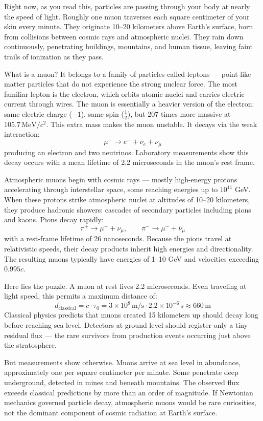 Right now, as you read this, particles are passing through your body at nearly the speed of light. Roughly one muon traverses each square centimeter of your skin every minute. They originate 10–20 kilometers above Earth's surface, born from collisions between cosmic rays and atmospheric nuclei. They rain down continuously, penetrating buildings, mountains, and human tissue, leaving faint trails of ionization as they pass.

What is a muon? It belongs to a family of particles called leptons — point-like matter particles that do not experience the strong nuclear force. The most familiar lepton is the electron, which orbits atomic nuclei and carries electric current through wires. The muon is essentially a heavier version of the electron: same electric charge ($-1$), same spin ($\tfrac{1}{2}$), but 207 times more massive at $105.7\,\text{MeV}/c^2$. This extra mass makes the muon unstable. It decays via the weak interaction:
\[
\mu^- \rightarrow e^- + \bar{\nu}_e + \nu_\mu
\]
producing an electron and two neutrinos. Laboratory measurements show this decay occurs with a mean lifetime of 2.2 microseconds in the muon's rest frame.

Atmospheric muons begin with cosmic rays — mostly high-energy protons accelerating through interstellar space, some reaching energies up to $10^{11}$ GeV. When these protons strike atmospheric nuclei at altitudes of 10–20 kilometers, they produce hadronic showers: cascades of secondary particles including pions and kaons. Pions decay rapidly:
\[
\pi^+ \rightarrow \mu^+ + \nu_\mu, \qquad \pi^- \rightarrow \mu^- + \bar{\nu}_\mu
\]
with a rest-frame lifetime of 26 nanoseconds. Because the pions travel at relativistic speeds, their decay products inherit high energies and directionality. The resulting muons typically have energies of 1–10 GeV and velocities exceeding $0.995c$.

Here lies the puzzle. A muon at rest lives 2.2 microseconds. Even traveling at light speed, this permits a maximum distance of:
\[
d_{\text{classical}} = c \cdot \tau_0 = 3 \times 10^8\,\text{m/s} \cdot 2.2 \times 10^{-6}\,\text{s} \approx 660\,\text{m}
\]
Classical physics predicts that muons created 15 kilometers up should decay long before reaching sea level. Detectors at ground level should register only a tiny residual flux — the rare survivors from production events occurring just above the stratosphere.

But measurements show otherwise. Muons arrive at sea level in abundance, approximately one per square centimeter per minute. Some penetrate deep underground, detected in mines and beneath mountains. The observed flux exceeds classical predictions by more than an order of magnitude. If Newtonian mechanics governed particle decay, atmospheric muons would be rare curiosities, not the dominant component of cosmic radiation at Earth's surface.

